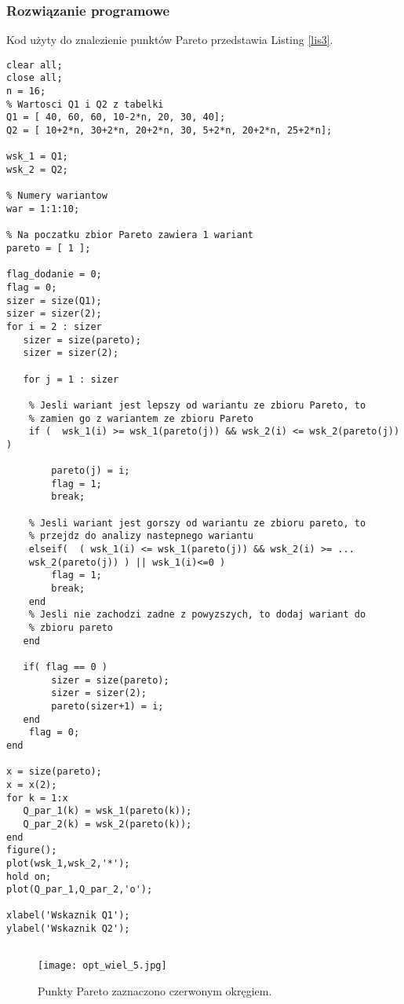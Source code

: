 \documentclass[a4paper,15pt]{article}
\begin{document}
\subsubsection{Rozwiązanie programowe}
Kod użyty do znalezienie punktów Pareto przedstawia Listing \ref{lis3}.
\begin{lstlisting}[caption=Wyznaczanie zbioru pareto, captionpos=b,label=lis3, firstnumber=1,frame=single]
clear all;
close all;
n = 16;
% Wartosci Q1 i Q2 z tabelki
Q1 = [ 40, 60, 60, 10-2*n, 20, 30, 40];
Q2 = [ 10+2*n, 30+2*n, 20+2*n, 30, 5+2*n, 20+2*n, 25+2*n];

wsk_1 = Q1;
wsk_2 = Q2;

% Numery wariantow
war = 1:1:10;

% Na poczatku zbior Pareto zawiera 1 wariant
pareto = [ 1 ];

flag_dodanie = 0;
flag = 0;
sizer = size(Q1);
sizer = sizer(2);
for i = 2 : sizer
   sizer = size(pareto);
   sizer = sizer(2);
   
   for j = 1 : sizer
    
    % Jesli wariant jest lepszy od wariantu ze zbioru Pareto, to 
    % zamien go z wariantem ze zbioru Pareto
    if (  wsk_1(i) >= wsk_1(pareto(j)) && wsk_2(i) <= wsk_2(pareto(j)) )
        
        pareto(j) = i;
        flag = 1;
        break;
    
    % Jesli wariant jest gorszy od wariantu ze zbioru pareto, to
    % przejdz do analizy nastepnego wariantu
    elseif(  ( wsk_1(i) <= wsk_1(pareto(j)) && wsk_2(i) >= ...
    wsk_2(pareto(j)) ) || wsk_1(i)<=0 )
        flag = 1;
        break;
    end
    % Jesli nie zachodzi zadne z powyzszych, to dodaj wariant do
    % zbioru pareto
   end
   
   if( flag == 0 )
        sizer = size(pareto);
        sizer = sizer(2);
        pareto(sizer+1) = i;     
   end
    flag = 0;
end

x = size(pareto);
x = x(2);
for k = 1:x
   Q_par_1(k) = wsk_1(pareto(k));
   Q_par_2(k) = wsk_2(pareto(k));
end
figure();
plot(wsk_1,wsk_2,'*');
hold on;
plot(Q_par_1,Q_par_2,'o');

xlabel('Wskaznik Q1');
ylabel('Wskaznik Q2');


\end{lstlisting}

\begin{figure}[H]
\centerline{\texttt{[image: opt\_wiel\_5.jpg]}}
\centering
\caption{Punkty Pareto zaznaczono czerwonym okręgiem. }
\label{fig:opt_wiel_5}
\end{figure}
\end{document}
